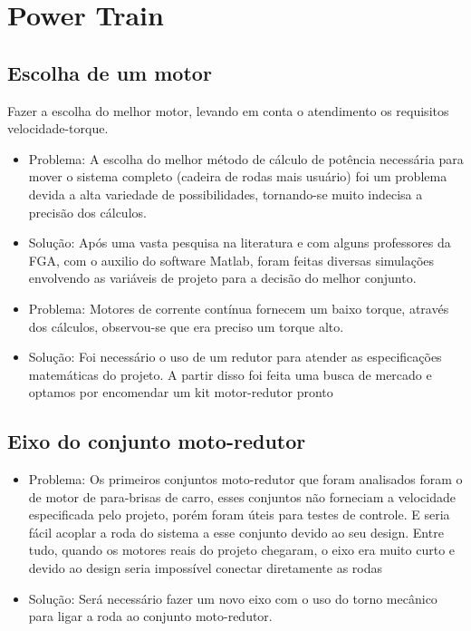 \section{Power Train}

\subsection{Escolha de um motor }
  Fazer a escolha do melhor motor, levando em conta o atendimento os requisitos velocidade-torque.
 \begin{itemize}
  \item Problema: A escolha do melhor método de cálculo de potência necessária para mover o sistema completo (cadeira de rodas mais usuário) foi um problema devida a alta variedade de possibilidades, tornando-se muito indecisa a precisão dos cálculos.
  \item Solução: Após uma vasta pesquisa na literatura e com alguns professores da FGA, com o auxilio do software Matlab, foram feitas diversas simulações envolvendo as variáveis de projeto para a decisão do melhor conjunto.

  \item Problema: Motores de corrente contínua fornecem um baixo torque, através dos cálculos, observou-se que era preciso um torque alto.
  \item Solução: Foi necessário o uso de um redutor para atender as especificações matemáticas do projeto. A partir disso foi feita uma busca de mercado e optamos por encomendar um kit motor-redutor pronto

 \end{itemize}

\subsection{Eixo do conjunto moto-redutor}
 \begin{itemize}
  \item Problema: Os primeiros conjuntos moto-redutor que foram analisados foram o de motor de para-brisas de carro, esses conjuntos não forneciam a velocidade especificada pelo projeto, porém foram úteis para testes de controle. E seria fácil acoplar a roda do sistema a esse conjunto devido ao seu design. Entre tudo, quando os motores reais do projeto chegaram, o eixo era muito curto e devido ao design seria impossível conectar diretamente as rodas
  \item Solução: Será necessário fazer um novo eixo com o uso do torno mecânico para ligar a roda ao conjunto moto-redutor.

 \end{itemize}

